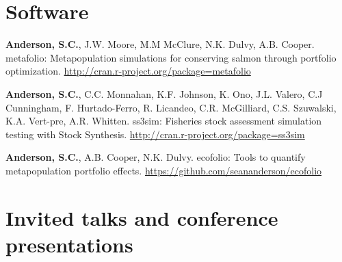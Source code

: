 \section{Software}\label{software}

\begin{description}
\itemsep3pt\parskip0pt
\item[2014]
\textbf{Anderson, S.C.}, J.W. Moore, M.M McClure, N.K. Dulvy, A.B.
Cooper.\\ metafolio: Metapopulation simulations for conserving salmon
through portfolio optimization.
\url{http://cran.r-project.org/package=metafolio}
\item[2013]
\textbf{Anderson, S.C.}, C.C. Monnahan, K.F. Johnson, K. Ono, J.L.
Valero, C.J Cunningham, F. Hurtado-Ferro, R. Licandeo, C.R. McGilliard,
C.S. Szuwalski, K.A. Vert-pre, A.R. Whitten. ss3sim: Fisheries stock
assessment simulation testing with Stock Synthesis.
\url{http://cran.r-project.org/package=ss3sim}
\item[2013]
\textbf{Anderson, S.C.}, A.B. Cooper, N.K. Dulvy. ecofolio: Tools to
quantify metapopulation portfolio effects.
\url{https://github.com/seananderson/ecofolio}
\end{description}

\section{Invited talks and conference
presentations}\label{invited-talks-and-conference-presentations}

